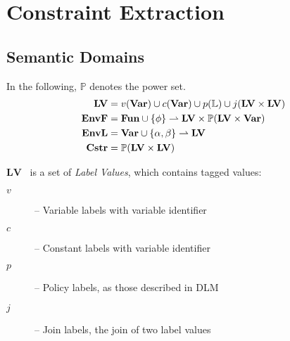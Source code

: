 
\newcommand{\iR}{\mathcal{R}}
\newcommand{\iD}{\mathcal{D}}
\newcommand{\iV}{\mathcal{V}}
\newcommand{\iF}{\mathcal{F}}
\newcommand{\iS}{\mathcal{S}}
\newcommand{\iE}{\mathcal{E}}
\newcommand{\iL}{\mathcal{L}}
\newcommand{\iO}{\mathcal{O}}

\newcommand{\iLV}{\mathbf{LV}}
\newcommand{\ilv}{lv}

\newcommand{\dblSq}[1]{[\![ #1 ]\!]}

\newcommand{\seSpace}{\\[1em]} %
\newcommand{\seWhere}[1]{& \quad \text{ where } #1 \nonumber}
\newcommand{\seAnd}[1]{& \quad \text{ and } #1 \nonumber}
\newcommand{\seIf}[1]{& \quad \text{ if } #1 \nonumber}

\newenvironment{semanticequations}{%
  \align%
}{%
  \endalign%
}

\newcommand{\semeq}[4]{%
#1 [\![#2]\!] \ifthenelse{\equal{#3}{}}{}{\; #3} \ifthenelse{\equal{#4}{}}{}{= #4} \nonumber
}

\newcommand{\csemeq}[5]{%
& \semeq{#1}{#2}{#3}{#4} \\
#5 \nonumber
}

\section{Constraint Extraction}

\subsection{Semantic Domains}
In the following, $\mathbb P$ denotes the power set.
\begin{align*}
\iLV    & = v(\iVar) \cup c(\iVar) \cup p(\mathbb{L}) \cup j(\iLV \times \iLV) \\
\iEnvF  & = \iFun \cup \{ \ifb \} \rightharpoonup \iLV \times \mathbb P (\iLV \times \iVar) \\
\iEnvL  & = \iVar \cup \{ \ia, \ib \} \rightharpoonup \iLV \\
\iCstr  & = \mathbb P (\iLV \times \iLV)
\end{align*}

$\iLV$~ is a set of \emph{Label Values}, which contains tagged values:
\begin{description}
  \item[$v$] -- Variable labels with variable identifier
  \item[$c$] -- Constant labels with variable identifier
  \item[$p$] -- Policy labels, as those described in DLM
  \item[$j$] -- Join labels, the join of two label values
\end{description}


